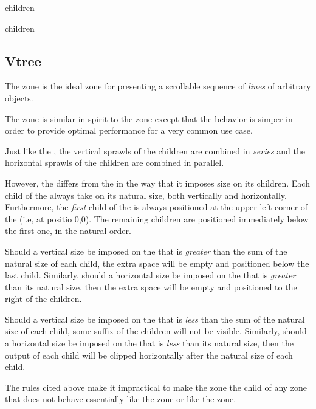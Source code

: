 
 {children}

 {\rest children}

\subsection{Vtree}
\label{sec-zones-layout-vtree}

The  zone is the ideal zone for presenting a scrollable
sequence of \emph{lines} of arbitrary objects.

The  zone is similar in spirit to the  zone
 except that the behavior is simper in
order to provide optimal performance for a very common use case.

Just like the , the vertical sprawls of the children are
combined in \emph{series} and the horizontal sprawls of the children
are combined in parallel.  

However, the  differs from the  in the way that
it imposes size on its children.  Each child of the 
always take on its natural size, both vertically and horizontally.
Furthermore, the \emph{first} child of the  is always
positioned at the upper-left corner of the  (i.e, at
positio 0,0).  The remaining children are positioned immediately below
the first one, in the natural order.  

Should a vertical size be imposed on the  that is
\emph{greater} than the sum of the natural size of each child, the
extra space will be empty and positioned below the last child.
Similarly, should a horizontal size be imposed on the 
that is \emph{greater} than its natural size, then the extra space
will be empty and positioned to the right of the children.

Should a vertical size be imposed on the  that is
\emph{less} than the sum of the natural size of each child, some
suffix of the children will not be visible.  Similarly, should a
horizontal size be imposed on the  that is \emph{less}
than its natural size, then the output of each child will be clipped
horizontally after the natural size of each child. 

The rules cited above make it impractical to make the 
zone the child of any zone that does not behave essentially like the
 zone or like the  zone.

